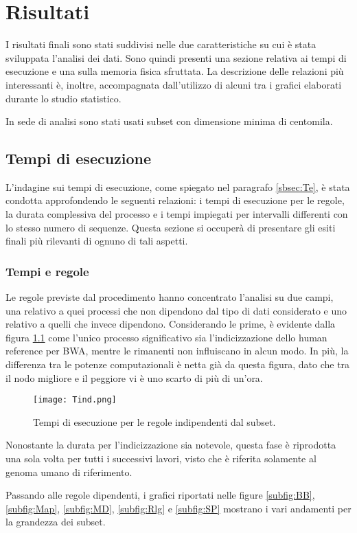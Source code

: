 \chapter{Risultati}
\label{cap:3}
I risultati finali sono stati suddivisi nelle due caratteristiche su cui è stata sviluppata l'analisi dei dati.
Sono quindi presenti una sezione relativa ai tempi di esecuzione e una sulla memoria fisica sfruttata. 
La descrizione delle relazioni più interessanti è, inoltre, accompagnata dall'utilizzo di alcuni tra i grafici elaborati durante lo studio statistico.

In sede di analisi sono stati usati subset con dimensione minima di centomila.

\section{Tempi di esecuzione}
L'indagine sui tempi di esecuzione, come spiegato nel paragrafo \ref{sbsec:Te}, è stata condotta approfondendo le seguenti relazioni: i tempi di esecuzione per le regole, la durata complessiva del processo e i tempi impiegati per intervalli differenti con lo stesso numero di sequenze. 
Questa sezione si occuperà di presentare gli esiti finali più rilevanti di ognuno di tali aspetti.

\subsection{Tempi e regole}
Le regole previste dal procedimento hanno concentrato l'analisi su due campi, una relativo a quei processi che non dipendono dal tipo di dati considerato e uno relativo a quelli che invece dipendono. 
Considerando le prime, è evidente dalla figura \ref{fig:Tind} come l'unico processo significativo sia l'indicizzazione dello human reference per BWA, mentre le rimanenti non influiscano in alcun modo. 
In più, la differenza tra le potenze computazionali è netta già da questa figura, dato che tra il nodo migliore e il peggiore vi è uno scarto di più di un'ora.
\begin{figure}[H]
\centering
\texttt{[image: Tind.png]}
\caption{Tempi di esecuzione per le regole indipendenti dal subset.}
\label{fig:Tind}
\end{figure}
Nonostante la durata per l'indicizzazione sia notevole, questa fase è riprodotta una sola volta per tutti i successivi lavori, visto che è riferita solamente al genoma umano di riferimento.

Passando alle regole dipendenti, i grafici riportati nelle figure \ref{subfig:BB}, \ref{subfig:Map}, \ref{subfig:MD}, \ref{subfig:Rlg} e \ref{subfig:SP} mostrano i vari andamenti per la grandezza dei subset.

